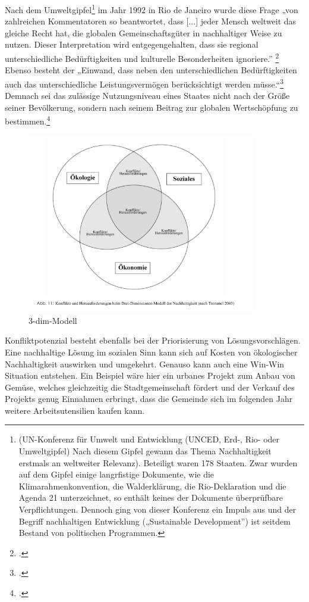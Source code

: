 \documentclass{scrartcl}
\begin{document}
Nach dem Umweltgipfel\footnote{(UN-Konferenz für Umwelt und Entwicklung (UNCED, Erd-, Rio- oder Umweltgipfel) Nach diesem Gipfel gewann das Thema Nachhaltigkeit erstmals an weltweiter Relevanz). Beteiligt waren 178 Staaten. Zwar wurden auf dem Gipfel einige langrfistige Dokumente, wie die Klimarahmenkonvention, die Walderklärung, die Rio-Deklaration und die Agenda 21 unterzeichnet, so enthält keines der Dokumente überprüfbare Verpflichtungen. Dennoch ging von dieser Konferenz ein Impuls aus und der Begriff nachhaltigen Entwicklung („Sustainable Development”) ist seitdem Bestand von politischen Programmen.} im Jahr 1992 in Rio de Janeiro wurde diese Frage „von zahlreichen Kommentatoren so beantwortet, dass [...] jeder Mensch weltweit das gleiche Recht hat, die globalen Gemeinschaftsgüter in nachhaltiger Weise zu nutzen. Dieser Interpretation wird entgegengehalten, dass sie regional unterschiedliche Bedürftigkeiten und kulturelle Besonderheiten ignoriere.” \footcite{NachhaltigeBrockhaus.de} Ebenso besteht der „Einwand, dass neben den unterschiedlichen Bedürftigkeiten auch das unterschiedliche Leistungsvermögen berücksichtigt werden müsse.“\footcite{NachhaltigeBrockhaus.de} Demnach sei das zulässige Nutzungsniveau eines Staates nicht nach der Größe seiner Bevölkerung, sondern nach seinem Beitrag zur globalen Wertschöpfung zu bestimmen.\footcite{NachhaltigeBrockhaus.de}

\begin{figure}[htbp]
\centering
\includegraphics[width=10cm]{image_folder/dreidimensionenmodell_der_N.png}
\caption{3-dim-Modell}
\label{fig:3-dimensionen Modell}
\end{figure}

Konfliktpotenzial besteht ebenfalls bei der Priorisierung von Lösungsvorschlägen. Eine nachhaltige Lösung im sozialen Sinn kann sich auf Kosten von ökologischer Nachhaltigkeit auswirken und umgekehrt. Genauso kann auch eine Win-Win Situation entstehen. Ein Beispiel wäre hier ein urbanes Projekt zum Anbau von Gemüse, welches gleichzeitig die Stadtgemeinschaft fördert und der Verkauf des Projekts genug Einnahmen erbringt, dass die Gemeinde sich im folgenden Jahr weitere Arbeitsutensilien kaufen kann.
\end{document}
